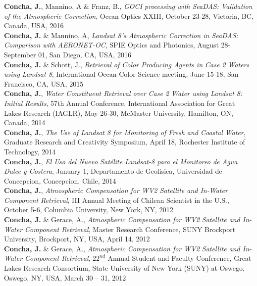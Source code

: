 \documentclass[11pt]{res}
\begin{document}
\begin{resume}
{\bf Concha, J.}, Mannino, A $\&$ Franz, B., {\it GOCI processing with SeaDAS: Validation of the Atmospheric Correction}, Ocean Optics XXIII, October 23-28, Victoria, BC, Canada, USA, 2016
\vspace{0.1in}\\
{\bf Concha, J.} $\&$ Mannino, A, {\it Landsat 8’s Atmospheric Correction in SeaDAS: Comparison with AERONET-OC}, SPIE Optics and Photonics,  August 28-September 01, San Diego, CA, USA, 2016
\vspace{-0.1in}\\
{\bf Concha, J.} $\&$ Schott, J., {\it Retrieval of Color Producing Agents in Case 2 Waters using Landsat 8}, International Ocean Color Science meeting, June 15-18, San Francisco, CA, USA, 2015
\vspace{0.1in}\\
{\bf Concha, J.}, {\it Water Constituent Retrieval over Case 2 Water using Landsat 8: Initial Results}, 57th Annual Conference, International Association for Great Lakes Research (IAGLR), May 26-30, McMaster University, Hamilton, ON, Canada, 2014
\vspace{0.1in}\\
{\bf Concha, J.}, {\it The Use of Landsat 8 for Monitoring of Fresh and Coastal Water}, Graduate Research and Creativity Symposium, April 18, Rochester Institute of Technology, 2014
\vspace{0.1in}\\
{\bf Concha, J.}, {\it El Uso del Nuevo Satélite Landsat-8 para el Monitoreo de Agua Dulce y Costera}, January 1, Departamento de Geofisica, Universidad de Concepcion, Concepcion, Chile, 2014
\vspace{0.1in}\\
{\bf Concha, J.}, {\it Atmospheric Compensation for WV2 Satellite and In-Water Component Retrieval}, III Annual Meeting of Chilean Scientist in the U.S., October 5-6, Columbia University, New York, NY, 2012
\vspace{0.1in}\\
{\bf Concha, J.} $\&$ Gerace, A., {\it Atmospheric Compensation for WV2 Satellite and In-Water Component Retrieval}, Master Research Conference, SUNY Brockport University, Brockport, NY, USA, April 14, 2012
\vspace{0.1in}\\
{\bf Concha, J.} $\&$ Gerace, A., {\it Atmospheric Compensation for WV2 Satellite and In-Water Component Retrieval}, $22^{nd}$ Annual Student and Faculty Conference, Great Lakes Research Consortium, State University of New York (SUNY) at Oswego, Oswego, NY, USA, March 30 -- 31, 2012\\


\end{resume}
\end{document}

